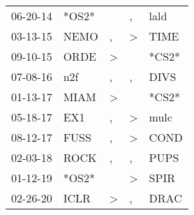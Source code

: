 \begin{supertabular}{lllll}
 06-20-14 &  *OS2* &               &                , &   lald \\
 03-13-15 &   NEMO &             , &     \textgreater &   TIME \\
 09-10-15 &   ORDE &  \textgreater &                  &  *CS2* \\
 07-08-16 &    n2f &             , &                , &   DIVS \\
 01-13-17 &   MIAM &  \textgreater &                  &  *CS2* \\
 05-18-17 &    EX1 &             , &     \textgreater &   mulc \\
 08-12-17 &   FUSS &             , &     \textgreater &   COND \\
 02-03-18 &   ROCK &             , &                , &   PUPS \\
 01-12-19 &  *OS2* &               &     \textgreater &   SPIR \\
 02-26-20 &   ICLR &  \textgreater &                , &   DRAC \\
\end{supertabular}
